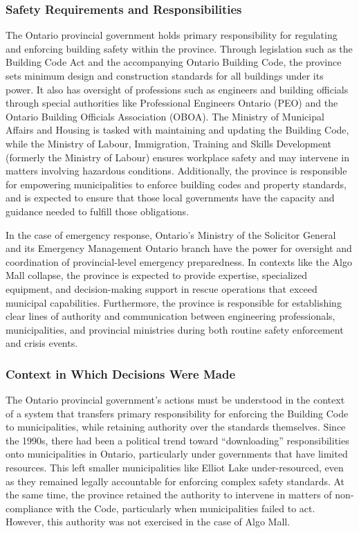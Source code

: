 \documentclass[12pt]{article}
\begin{document}
\subsubsection*{Safety Requirements and Responsibilities}

The Ontario provincial government holds primary responsibility for regulating and enforcing building safety within the province. Through legislation such as the Building Code Act and the accompanying Ontario Building Code, the province sets minimum design and construction standards for all buildings under its power. It also has oversight of professions such as engineers and building officials through special authorities like Professional Engineers Ontario (PEO) and the Ontario Building Officials Association (OBOA). The Ministry of Municipal Affairs and Housing is tasked with maintaining and updating the Building Code, while the Ministry of Labour, Immigration, Training and Skills Development (formerly the Ministry of Labour) ensures workplace safety and may intervene in matters involving hazardous conditions. Additionally, the province is responsible for empowering municipalities to enforce building codes and property standards, and is expected to ensure that those local governments have the capacity and guidance needed to fulfill those obligations.

In the case of emergency response, Ontario's Ministry of the Solicitor General and its Emergency Management Ontario branch have the power for oversight and coordination of provincial-level emergency preparedness. In contexts like the Algo Mall collapse, the province is expected to provide expertise, specialized equipment, and decision-making support in rescue operations that exceed municipal capabilities. Furthermore, the province is responsible for establishing clear lines of authority and communication between engineering professionals, municipalities, and provincial ministries during both routine safety enforcement and crisis events.

\subsubsection*{Context in Which Decisions Were Made}

The Ontario provincial government's actions must be understood in the context of a system that transfers primary responsibility for enforcing the Building Code to municipalities, while retaining authority over the standards themselves. Since the 1990s, there had been a political trend toward ``downloading'' responsibilities onto municipalities in Ontario, particularly under governments that have limited resources. This left smaller municipalities like Elliot Lake under-resourced, even as they remained legally accountable for enforcing complex safety standards. At the same time, the province retained the authority to intervene in matters of non-compliance with the Code, particularly when municipalities failed to act. However, this authority was not exercised in the case of Algo Mall.
\end{document}
